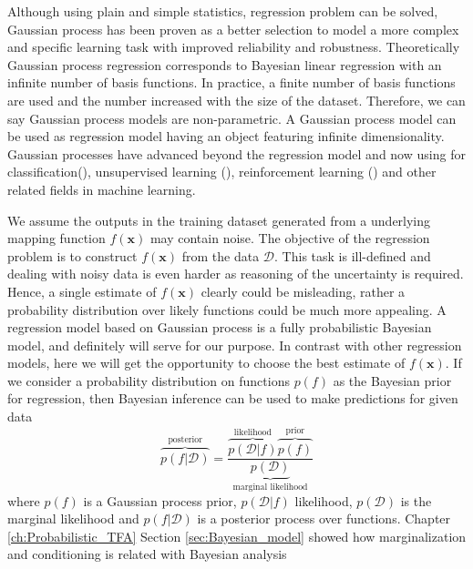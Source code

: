 Although using plain and simple statistics, regression problem can be solved, Gaussian process has been proven as a better selection to model a more complex and specific learning task with improved reliability and robustness. Theoretically Gaussian process regression corresponds to Bayesian linear regression with an infinite number of basis functions. In practice, a finite number of basis functions are used and the number increased with the size of the dataset. Therefore, we can say Gaussian process models are non-parametric. A Gaussian process model can be used as regression model having an object featuring infinite dimensionality. Gaussian processes have advanced beyond the regression model and now using for classification(\cite{Williams:1998, Nickisch:2008}), unsupervised learning (\cite{Ek:2008}), reinforcement learning (\cite{Deisenroth:2012}) and other related fields in machine learning.

We assume the outputs in the training dataset generated from a underlying mapping function $f(\textbf{x})$ may contain noise. The objective of the regression problem is to construct $f(\textbf{x})$ from the data $\mathcal{D}$. This task is ill-defined and dealing with noisy data is even harder as reasoning of the uncertainty is required. Hence, a single estimate of $f(\textbf{x})$ clearly could be misleading, rather a probability distribution over likely functions could be much more appealing. A regression model based on Gaussian process is a fully probabilistic Bayesian model, and definitely will serve for our purpose. In contrast with other regression models, here we will get the opportunity to choose the best estimate of $f(\textbf{x})$. If we consider a probability distribution on functions $p(f)$ as the Bayesian prior for regression, then Bayesian inference can be used to make predictions for given data 
\begin{equation} \label{eq:2.1}
\overbrace{p\left(f|\mathcal{D}\right)}^{\text{posterior}}= \frac{\overbrace{p\left(\mathcal{D}|f\right)}^{\text{likelihood}}\overbrace{p\left(f\right)}^{\text {prior}}}{\underbrace{p\left(\mathcal{D}\right)}_{\text {marginal likelihood}}} 
\end{equation}
where $p\left(f\right)$ is a Gaussian process prior, $p\left(\mathcal{D}|f\right)$ likelihood, $p\left(\mathcal{D}\right)$ is the marginal likelihood and $p\left(f|\mathcal{D}\right)$ is a posterior process over functions. Chapter \ref{ch:Probabilistic_TFA} Section \ref{sec:Bayesian_model} showed how marginalization and conditioning is related with Bayesian analysis

